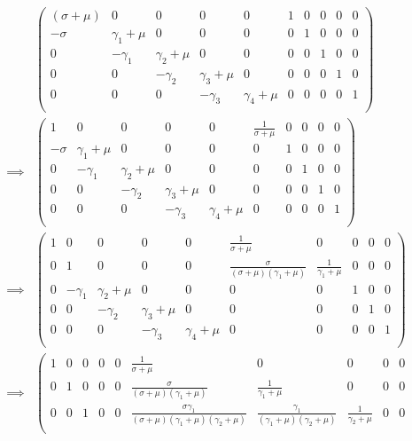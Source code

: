 \documentclass{article}
\begin{document}
$$
\begin{aligned}
&\left(\begin{array}{ccccc|ccccc}
(\sigma + \mu) & 0 & 0 & 0 & 0 & 1 & 0 & 0 & 0 & 0\\
- \sigma & \gamma_1 + \mu & 0 & 0 & 0 & 0 & 1 & 0 & 0 & 0\\
0 & - \gamma_1 & \gamma_2 + \mu & 0 & 0 & 0 & 0 & 1 & 0 & 0\\
0 & 0 & - \gamma_2 & \gamma_3 + \mu & 0 & 0 & 0 & 0 & 1 & 0\\
0 & 0 & 0 & - \gamma_3 & \gamma_4 + \mu & 0 & 0 & 0 & 0 & 1\\
\end{array}\right)\\
\implies
&\left(\begin{array}{ccccc|ccccc}
1 & 0 & 0 & 0 & 0 & \frac{1}{\sigma + \mu} & 0 & 0 & 0 & 0\\
- \sigma & \gamma_1 + \mu & 0 & 0 & 0 & 0 & 1 & 0 & 0 & 0\\
0 & - \gamma_1 & \gamma_2 + \mu & 0 & 0 & 0 & 0 & 1 & 0 & 0\\
0 & 0 & - \gamma_2 & \gamma_3 + \mu & 0 & 0 & 0 & 0 & 1 & 0\\
0 & 0 & 0 & - \gamma_3 & \gamma_4 + \mu & 0 & 0 & 0 & 0 & 1\\
\end{array}\right)\\
\implies
&\left(\begin{array}{ccccc|ccccc}
1 & 0 & 0 & 0 & 0 & \frac{1}{\sigma + \mu} & 0 & 0 & 0 & 0\\
0 & 1 & 0 & 0 & 0 & \frac{\sigma}{(\sigma + \mu)(\gamma_1 + \mu)} & \frac{1}{\gamma_1 + \mu} & 0 & 0 & 0\\
0 & - \gamma_1 & \gamma_2 + \mu & 0 & 0 & 0 & 0 & 1 & 0 & 0\\
0 & 0 & - \gamma_2 & \gamma_3 + \mu & 0 & 0 & 0 & 0 & 1 & 0\\
0 & 0 & 0 & - \gamma_3 & \gamma_4 + \mu & 0 & 0 & 0 & 0 & 1\\
\end{array}\right)\\
\implies
&\left(\begin{array}{ccccc|ccccc}
1 & 0 & 0 & 0 & 0 & \frac{1}{\sigma + \mu} & 0 & 0 & 0 & 0\\
0 & 1 & 0 & 0 & 0 & \frac{\sigma}{(\sigma + \mu)(\gamma_1 + \mu)} & \frac{1}{\gamma_1 + \mu} & 0 & 0 & 0\\
0 & 0 & 1 & 0 & 0 & \frac{\sigma \gamma_1}{(\sigma + \mu)(\gamma_1 + \mu)(\gamma_2 + \mu)} & \frac{\gamma_1}{(\gamma_1 + \mu)(\gamma_2 + \mu)} & \frac{1}{\gamma_2 + \mu} & 0 & 0\\

\end{array}
\end{aligned}$$
\end{document}
